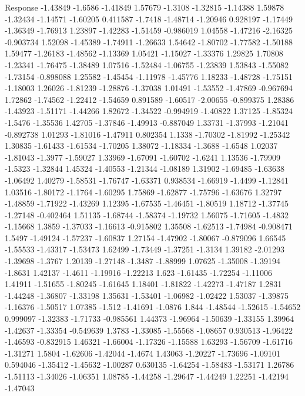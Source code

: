\documentclass[9pt]{article}
\theoremstyle{plain}
\theoremstyle{definition}
\theoremstyle{remark}
\numberwithin{equation}{section}
\begin{document}
Response
-1.43849
-1.6586
-1.41849
1.57679
-1.3108
-1.32815
-1.14388
1.59878
-1.32434
-1.14571
-1.60205
0.411587
-1.7418
-1.48714
-1.20946
0.928197
-1.17449
-1.36349
-1.76913
1.23897
-1.42283
-1.51459
-0.986019
1.04558
-1.47216
-2.16325
-0.903734
1.52098
-1.45389
-1.74911
-1.26633
1.54642
-1.80702
-1.77582
-1.50188
1.59477
-1.26183
-1.48562
-1.13369
1.05421
-1.15027
-1.33376
1.29825
1.70808
-1.23341
-1.76475
-1.38489
1.07516
-1.52484
-1.06755
-1.23839
1.53843
-1.55082
-1.73154
-0.898088
1.25582
-1.45454
-1.11978
-1.45776
1.18233
-1.48728
-1.75151
-1.18003
1.26026
-1.81239
-1.28876
-1.37038
1.01491
-1.53552
-1.47869
-0.967694
1.72862
-1.74562
-1.22412
-1.54659
0.891589
-1.60517
-2.00655
-0.899375
1.28386
-1.43923
-1.51171
-1.44266
1.82672
-1.34522
-0.994919
-1.40822
1.37125
-1.85324
-1.5476
-1.35536
1.42705
-1.37846
-1.49913
-0.887049
1.33731
-1.37993
-1.21041
-0.892738
1.01293
-1.81016
-1.47911
0.802354
1.1338
-1.70302
-1.81992
-1.25342
1.30835
-1.61433
-1.61534
-1.70205
1.38072
-1.18334
-1.3688
-1.6548
1.02037
-1.81043
-1.3977
-1.59027
1.33969
-1.67091
-1.60702
-1.6241
1.13536
-1.79909
-1.5323
-1.32844
1.45324
-1.40553
-1.21344
-1.08189
1.31902
-1.69485
-1.63638
-1.06492
1.40279
-1.58531
-1.76747
-1.63371
0.938534
-1.66919
-1.4499
-1.12841
1.03516
-1.80172
-1.1764
-1.60295
1.75869
-1.62877
-1.75796
-1.63676
1.32797
-1.48859
-1.71922
-1.43269
1.12395
-1.67535
-1.46451
-1.80519
1.18712
-1.37745
-1.27148
-0.402464
1.51135
-1.68744
-1.58374
-1.19732
1.56075
-1.71605
-1.4832
-1.15668
1.3859
-1.37033
-1.16613
-0.915802
1.35508
-1.62513
-1.74984
-0.908471
1.5497
-1.49124
-1.57237
-1.60837
1.27154
-1.47902
-1.80067
-0.879096
1.66545
-1.55533
-1.43317
-1.53473
1.62499
-1.73449
-1.37251
-1.3134
1.39182
-2.01293
-1.39698
-1.3767
1.20139
-1.27148
-1.3487
-1.88999
1.07625
-1.35008
-1.39194
-1.8631
1.42137
-1.4611
-1.19916
-1.22213
1.623
-1.61435
-1.72254
-1.11006
1.41911
-1.51655
-1.80245
-1.61645
1.18401
-1.81822
-1.42273
-1.47187
1.2831
-1.44248
-1.36807
-1.33198
1.35631
-1.53401
-1.06982
-1.02422
1.53037
-1.39875
-1.16376
-1.50517
1.07385
-1.512
-1.41691
-1.0876
1.844
-1.48544
-1.52615
-1.54652
0.999097
-1.32383
-1.71733
-0.985561
1.44373
-1.96964
-1.50639
-1.33155
1.39964
-1.42637
-1.33354
-0.549639
1.3783
-1.33085
-1.55568
-1.08657
0.930513
-1.96422
-1.46593
-0.832915
1.46321
-1.66004
-1.17326
-1.15588
1.63293
-1.56709
-1.61716
-1.31271
1.5804
-1.62606
-1.42044
-1.4674
1.43063
-1.20227
-1.73696
-1.09101
0.594046
-1.35412
-1.45632
-1.00287
0.630135
-1.64254
-1.58483
-1.53171
1.26786
-1.51113
-1.34026
-1.06351
1.08785
-1.44258
-1.29647
-1.44249
1.22251
-1.42194
-1.47043
\end{document}
